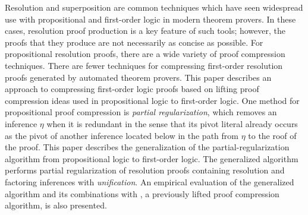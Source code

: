 Resolution and superposition are common techniques which have seen widespread use with propositional and first-order logic in modern theorem provers. In these cases, resolution proof production is a key feature of such tools; however, the proofs that they produce are not necessarily as concise as possible.
For propositional resolution proofs, there are a wide variety of proof compression techniques. There are fewer techniques for compressing first-order resolution proofs generated by automated theorem provers.
This paper describes an approach to compressing first-order logic proofs based on lifting proof compression ideas used in propositional logic to first-order logic. One method for propositional proof compression is \emph{partial regularization}, which removes an inference $\eta$ when it is redundant in the sense that its pivot literal already occurs as the pivot of another inference located below in the path from $\eta$ to the roof of the proof. 
This paper describes the generalization of the partial-regularization algorithm
from propositional logic to first-order logic. The generalized algorithm performs partial regularization of resolution proofs containing resolution and factoring inferences with \emph{unification}. %
An empirical evaluation of the generalized algorithm and its combinations with , a previously lifted proof compression algorithm, is also presented.




